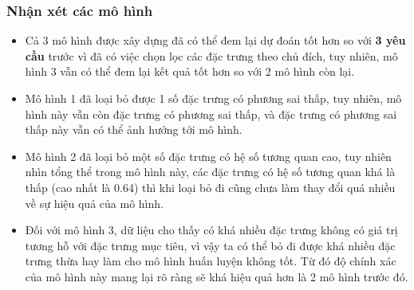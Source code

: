 \documentclass{report}
\begin{document}
    \subsubsection{Nhận xét các mô hình}
    \begin{itemize}
        \item Cả 3 mô hình được xây dựng đã có thể đem lại dự đoán tốt hơn so với \textbf{3 yêu cầu} trước vì đã có việc chọn lọc các đặc trưng theo chủ đích, tuy nhiên, mô hình 3 vẫn có thể đem lại kết quả tốt hơn so với 2 mô hình còn lại.
        \item Mô hình 1 đã loại bỏ được 1 số đặc trưng có phương sai thấp, tuy nhiên, mô hình này vẫn còn đặc trưng có phương sai thấp, và đặc trưng có phương sai thấp này vẫn có thể ảnh hưởng tới mô hình.
        \item Mô hình 2 đã loại bỏ một số đặc trưng có hệ số tương quan cao, tuy nhiên nhìn tổng thể trong mô hình này, các đặc trưng có hệ số tương quan khá là thấp (cao nhất là 0.64) thì khi loại bỏ đi cũng chưa làm thay đổi quá nhiều về sự hiệu quả của mô hình.
        \item Đối với mô hình 3, dữ liệu cho thấy có khá nhiều đặc trưng không có giá trị tương hỗ với đặc trưng mục tiêu, vì vậy ta có thể bỏ đi được khá nhiều đặc trưng thừa hay làm cho mô hình huấn luyện không tốt. Từ đó độ chính xác của mô hình này mang lại rõ ràng sẽ khá hiệu quả hơn là 2 mô hình trước đó.
    \end{itemize}
\end{document}
